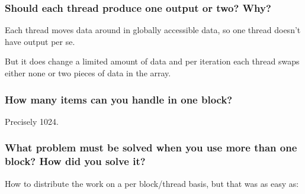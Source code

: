 \documentclass[a4paper,12pt]{article}
\begin{document}
\subsubsection{Should each thread produce one output or two? Why?}

Each thread moves data around in globally accessible data, so one thread doesn't have output per se.

But it does change a limited amount of data and per iteration each thread swaps either none or two pieces of data in the array.

\subsubsection{How many items can you handle in one block?}

Precisely 1024.

\subsubsection{What problem must be solved when you use more than one block? How did you solve it?}

How to distribute the work on a per block/thread basis, but that was as easy as:
\end{document}
